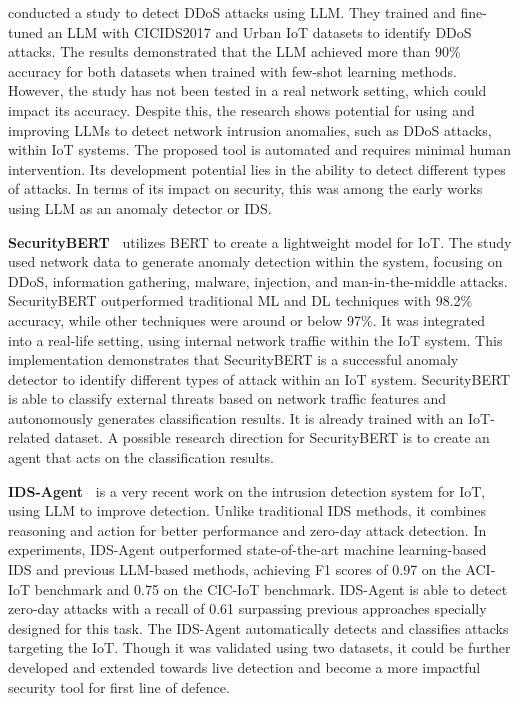 \smallskip
\noindent \textbf{\citet{guastalla2023application}} conducted a study to detect DDoS attacks using LLM.
They trained and fine-tuned an LLM with CICIDS2017 and Urban IoT datasets to identify DDoS attacks.
The results demonstrated that the LLM achieved more than 90\% accuracy for both datasets when trained with few-shot learning methods.
However, the study has not been tested in a real network setting, which could impact its accuracy.
Despite this, the research shows potential for using and improving LLMs to detect network intrusion anomalies, such as DDoS attacks, within IoT systems.
The proposed tool is automated and requires minimal human intervention.
Its development potential lies in the ability to detect different types of attacks.
In terms of its impact on security, this was among the early works using LLM as an anomaly detector or IDS.

\smallskip
\noindent \textbf{SecurityBERT~\citet{ferrag2024revolutionizing}} utilizes BERT to create a lightweight model for IoT.
The study used network data to generate anomaly detection within the system, focusing on DDoS, information gathering, malware, injection, and man-in-the-middle attacks.
SecurityBERT outperformed traditional ML and DL techniques with 98.2\% accuracy, while other techniques were around or below 97\%.
It was integrated into a real-life setting, using internal network traffic within the IoT system.
This implementation demonstrates that SecurityBERT is a successful anomaly detector to identify different types of attack within an IoT system.
SecurityBERT is able to classify external threats based on network traffic features and autonomously generates classification results.
It is already trained with an IoT-related dataset.
A possible research direction for SecurityBERT is to create an agent that acts on the classification results.

\smallskip
\noindent \textbf{IDS-Agent~\citet{li2024idsagent}} is a very recent work on the intrusion detection system for IoT, using LLM to improve detection.
Unlike traditional IDS methods, it combines reasoning and action for better performance and zero-day attack detection.
In experiments, IDS-Agent outperformed state-of-the-art machine learning-based IDS and previous LLM-based methods, achieving F1 scores of 0.97 on the ACI-IoT benchmark and 0.75 on the CIC-IoT benchmark.
IDS-Agent is able to detect zero-day attacks with a recall of 0.61 surpassing previous approaches specially designed for this task.
The IDS-Agent automatically detects and classifies attacks targeting the IoT.
Though it was validated using two datasets, it could be further developed and extended towards live detection and become a more impactful security tool for first line of defence.

